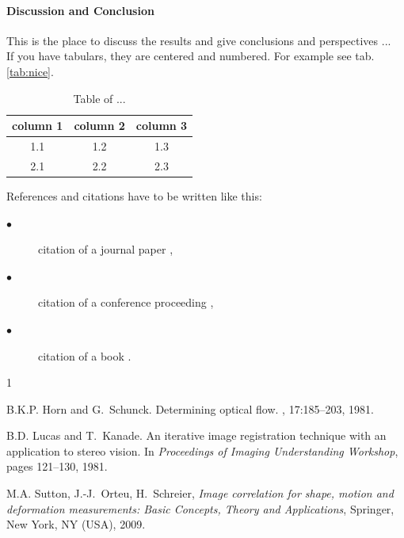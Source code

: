 \documentclass{PMIDIC2020}
\begin{document}
\paragraph{Discussion and Conclusion} This is the place to discuss the results and give conclusions and perspectives ...\\

If you have tabulars, they are centered and numbered. For example see tab.\eqref{tab:nice}.

\begin{table}[htbp!]
\centering
\begin{tabular}{|c|c|c|}
  \hline
\textbf{  column 1} & \textbf{column 2 }&\textbf{ column 3 }\\
  \hline
  1.1 & 1.2 & 1.3 \\
  2.1 & 2.2 & 2.3 \\
  \hline
\end{tabular}
\caption{Table of ... }\label{tab:nice}
\end{table}


%

References and citations have to be written like this: 
\begin{description}
\item[$\bullet$] citation of a journal paper \cite{horn81},
\item[$\bullet$] citation of a conference proceeding \cite{lucas81}, 
\item[$\bullet$] citation of  a book \cite{sutton09}.
\end{description}


%
\begin{thebibliography}{1}

B.K.P. Horn and G.~Schunck.
\newblock Determining optical flow.
, 17:185--203, 1981.

B.D. Lucas and T.~Kanade. 
\newblock An iterative image registration technique with an application to stereo vision. 
\newblock In {\em Proceedings of Imaging Understanding Workshop}, pages 121--130, 1981.

M.A. Sutton, J.-J.~Orteu, H.~Schreier, 
\newblock \emph{Image correlation for shape, motion and deformation measurements: Basic Concepts, Theory and Applications}, 
\newblock Springer, New York, NY (USA), 2009.


\end{thebibliography}

\end{document}
